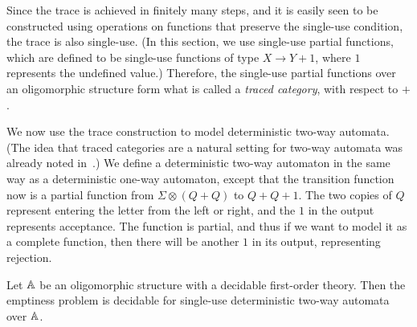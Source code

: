 Since the trace is achieved in finitely many steps, and it is easily seen to be constructed using operations on functions that preserve the single-use condition, the trace is also single-use. (In this section, we use single-use partial functions, which are defined to be single-use functions of type $X \to Y +1$, where $1$ represents the undefined value.) Therefore, the single-use partial functions over an oligomorphic structure form what is called a \emph{traced category}, with respect to $+$. 



We now use the trace construction to model deterministic two-way automata. (The idea that traced categories are a natural setting for two-way automata was already noted in~\cite{hines2003categorical}.) We define a deterministic two-way automaton in the same way as a deterministic one-way automaton, except that the transition function now is a partial function from $\Sigma \otimes (Q + Q)$ to $Q + Q + 1$. 
The two copies of $Q$ represent entering the letter from the left or right, and the $1$ in the output represents acceptance.  The function is partial, and thus if we want to model it as a complete function, then there will be another $1$ in its output, representing rejection.

\begin{theorem}\label{thm:two-way-automata}
    Let $\mathbb A$ be an oligomorphic structure with a decidable first-order theory. Then the emptiness problem is decidable for single-use deterministic  two-way automata over $\mathbb A$.
\end{theorem}


